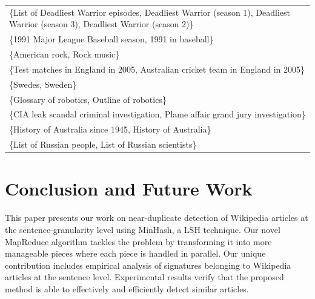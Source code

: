 \documentclass{acm_proc_article-sp}
\begin{document}
\begin{table}
{\begin{tabular}{| l |}
\{List of Deadliest Warrior episodes, Deadliest Warrior (season 1), Deadliest Warrior (season 3), Deadliest Warrior (season 2)\} \\
\{1991 Major League Baseball season, 1991 in baseball\} \\
\{American rock, Rock music\} \\
\{Test matches in England in 2005, Australian cricket team in England in 2005\} \\
\{Swedes, Sweden\} \\
\{Glossary of robotics, Outline of robotics\} \\
\{CIA leak scandal criminal investigation, Plame affair grand jury investigation\} \\
\{History of Australia since 1945, History of Australia\} \\
\{List of Russian people, List of Russian scientists\} \\
    \hline
\end{tabular}
}
\end{table}


\section{Conclusion and Future Work}
This paper presents our work on near-duplicate detection of Wikipedia articles at the sentence-granularity level using MinHash, a LSH technique. Our novel MapReduce algorithm tackles the problem by transforming it into more manageable pieces where each piece is handled in parallel. Our unique contribution includes empirical analysis of signatures belonging to Wikipedia articles at the sentence level. Experimental results verify that the proposed method is able to effectively and efficiently detect similar articles.
\end{document}
